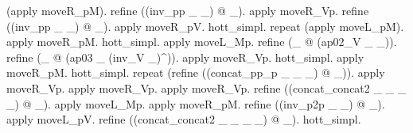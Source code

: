 \begin{coqdoccode}
\begin{coqdoccomment}
(apply\coqdocindent{0.50em}
moveR\_pM).\coqdoceol
\coqdocindent{1.00em}
refine\coqdocindent{0.50em}
((inv\_pp\coqdocindent{0.50em}
\_\coqdocindent{0.50em}
\_)\coqdocindent{0.50em}
@\coqdocindent{0.50em}
\_).\coqdocindent{0.50em}
apply\coqdocindent{0.50em}
moveR\_Vp.\coqdoceol
\coqdocindent{1.00em}
refine\coqdocindent{0.50em}
((inv\_pp\coqdocindent{0.50em}
\_\coqdocindent{0.50em}
\_)\coqdocindent{0.50em}
@\coqdocindent{0.50em}
\_).\coqdocindent{0.50em}
apply\coqdocindent{0.50em}
moveR\_pV.\coqdocindent{0.50em}
hott\_simpl.\coqdoceol
\coqdocindent{1.00em}
repeat\coqdocindent{0.50em}
(apply\coqdocindent{0.50em}
moveL\_pM).\coqdocindent{0.50em}
apply\coqdocindent{0.50em}
moveR\_pM.\coqdocindent{0.50em}
hott\_simpl.\coqdocindent{0.50em}
\coqdoceol
\coqdocindent{1.00em}
apply\coqdocindent{0.50em}
moveL\_Mp.\coqdocindent{0.50em}
refine\coqdocindent{0.50em}
(\_\coqdocindent{0.50em}
@\coqdocindent{0.50em}
(ap02\_V\coqdocindent{0.50em}
\_\coqdocindent{0.50em}
\_)).\coqdoceol
\coqdocindent{1.00em}
refine\coqdocindent{0.50em}
(\_\coqdocindent{0.50em}
@\coqdocindent{0.50em}
(ap03\coqdocindent{0.50em}
\_\coqdocindent{0.50em}
(inv\_V\coqdocindent{0.50em}
\_)\^{})).\coqdocindent{0.50em}
apply\coqdocindent{0.50em}
moveR\_Vp.\coqdocindent{0.50em}
hott\_simpl.\coqdoceol
\coqdocindent{1.00em}
apply\coqdocindent{0.50em}
moveR\_pM.\coqdocindent{0.50em}
hott\_simpl.\coqdoceol
\coqdocindent{1.00em}
repeat\coqdocindent{0.50em}
(refine\coqdocindent{0.50em}
((concat\_pp\_p\coqdocindent{0.50em}
\_\coqdocindent{0.50em}
\_\coqdocindent{0.50em}
\_)\coqdocindent{0.50em}
@\coqdocindent{0.50em}
\_)).\coqdocindent{0.50em}
apply\coqdocindent{0.50em}
moveR\_Vp.\coqdocindent{0.50em}
apply\coqdocindent{0.50em}
moveR\_Vp.\coqdoceol
\coqdocindent{1.00em}
apply\coqdocindent{0.50em}
moveR\_Vp.\coqdocindent{0.50em}
refine\coqdocindent{0.50em}
((concat\_concat2\coqdocindent{0.50em}
\_\coqdocindent{0.50em}
\_\coqdocindent{0.50em}
\_\coqdocindent{0.50em}
\_)\coqdocindent{0.50em}
@\coqdocindent{0.50em}
\_).\coqdoceol
\coqdocindent{1.00em}
apply\coqdocindent{0.50em}
moveL\_Mp.\coqdocindent{0.50em}
apply\coqdocindent{0.50em}
moveR\_pM.\coqdocindent{0.50em}
refine\coqdocindent{0.50em}
((inv\_p2p\coqdocindent{0.50em}
\_\coqdocindent{0.50em}
\_)\coqdocindent{0.50em}
@\coqdocindent{0.50em}
\_).\coqdocindent{0.50em}
apply\coqdocindent{0.50em}
moveL\_pV.\coqdoceol
\coqdocindent{1.00em}
refine\coqdocindent{0.50em}
((concat\_concat2\coqdocindent{0.50em}
\_\coqdocindent{0.50em}
\_\coqdocindent{0.50em}
\_\coqdocindent{0.50em}
\_)\coqdocindent{0.50em}
@\coqdocindent{0.50em}
\_).\coqdocindent{0.50em}
hott\_simpl.\coqdoceol

\end{coqdoccomment}
\end{coqdoccode}
